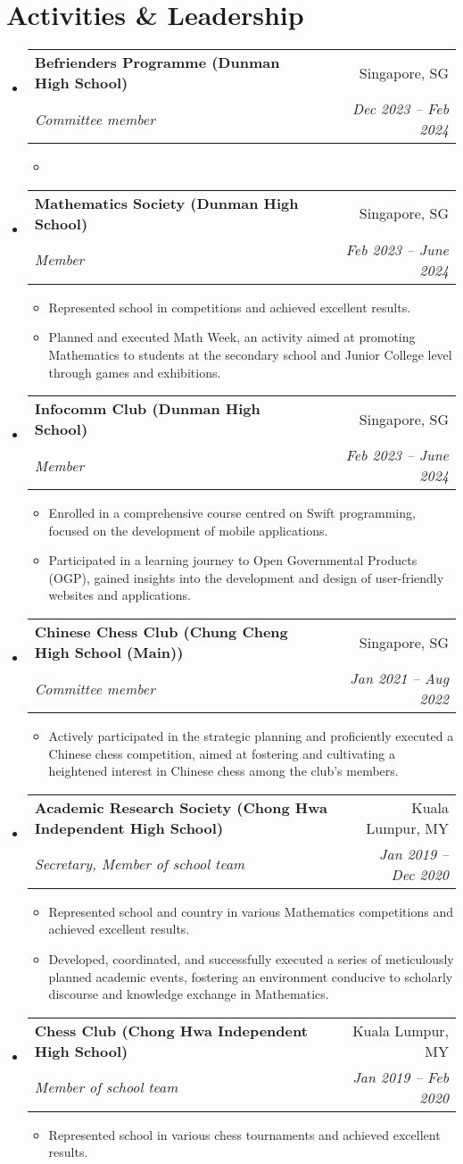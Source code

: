 \documentclass[a4paper,11pt]{article}
\makeatletter
\newcommand{\resumeItemPaper}[1]{
    \item\small{
            {#1}
    }
}
\newcommand{\resumeSubheading}[4]{
    \vspace{-1pt}\item
    \begin{tabular*}{0.97\textwidth}{l@{\extracolsep{\fill}}r}
        \textbf{#1}       & #2                 \\
        \textit{\small#3} & \textit{\small #4} \\
    \end{tabular*}\vspace{-5pt}
}
\newcommand{\resumeSubHeadingListStart}{\begin{itemize}[leftmargin=*]}
\newcommand{\resumeSubHeadingListEnd}{\end{itemize}}
\newcommand{\resumeItemListStart}{\begin{itemize}}
\newcommand{\resumeItemListEnd}{\end{itemize}\vspace{-5pt}}
\makeatother
\begin{document}
\section{Activities \& Leadership}
\resumeSubHeadingListStart
\resumeSubheading
{Befrienders Programme (Dunman High School)}{Singapore, SG}
{Committee member}{Dec 2023 -- Feb 2024}
\resumeItemListStart
\resumeItemPaper{}
\resumeItemListEnd

\resumeSubheading
{Mathematics Society (Dunman High School)}{Singapore, SG}
{Member}{Feb 2023 -- June 2024}
\resumeItemListStart
\resumeItemPaper{Represented school in competitions and achieved excellent results.}
\resumeItemPaper{Planned and executed Math Week, an activity aimed at promoting Mathematics to students at the secondary school and Junior College level through games and exhibitions.}
\resumeItemListEnd

\resumeSubheading
{Infocomm Club (Dunman High School)}{Singapore, SG}
{Member}{Feb 2023 -- June 2024}
\resumeItemListStart
\resumeItemPaper{Enrolled in a comprehensive course centred on Swift programming, focused on the development of mobile applications.}
\resumeItemPaper{Participated in a learning journey to Open Governmental Products (OGP), gained insights into the development and design of user-friendly websites and applications.}
\resumeItemListEnd

\resumeSubheading
{Chinese Chess Club (Chung Cheng High School (Main))}{Singapore, SG}
{Committee member}{Jan 2021 -- Aug 2022}
\resumeItemListStart
\resumeItemPaper{Actively participated in the strategic planning and proficiently executed a Chinese chess competition, aimed at fostering and cultivating a heightened interest in Chinese chess among the club’s members.}
\resumeItemListEnd

\resumeSubheading
{Academic Research Society (Chong Hwa Independent High School)}{Kuala Lumpur, MY}
{Secretary, Member of school team}{Jan 2019 -- Dec 2020}
\resumeItemListStart
\resumeItemPaper{Represented school and country in various Mathematics competitions and achieved excellent results.}
\resumeItemPaper{Developed, coordinated, and successfully executed a series of meticulously planned academic events, fostering an environment conducive to scholarly discourse and knowledge exchange in Mathematics.}
\resumeItemListEnd

\resumeSubheading
{Chess Club (Chong Hwa Independent High School)}{Kuala Lumpur, MY}
{Member of school team}{Jan 2019 -- Feb 2020}
\resumeItemListStart
\resumeItemPaper{Represented school in various chess tournaments and achieved excellent results.}
\resumeItemListEnd
\resumeSubHeadingListEnd
\end{document}

